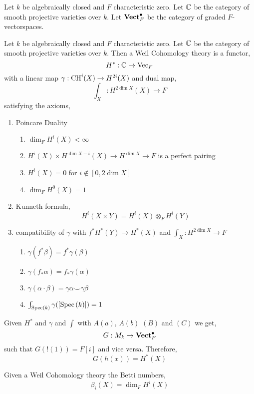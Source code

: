\documentclass[12pt]{article}
\begin{document}
\begin{definition}
Let $k$ be algebraically closed and $F$ characteristic zero. Let $\mathbb{C}$ be the category of smooth projective varieties over $k$. Let $\mathbf{Vect}_F^\bullet$ be the category of graded $F$-vectorspaces. 
\end{definition}

\begin{definition}
Let $k$ be algebraically closed and $F$ characteristic zero. Let $\mathbb{C}$ be the category of smooth projective varieties over $k$. Then a Weil Cohomology theory is a functor,
\[ H^* : \mathbb{C} \to \mathrm{Vec}_F \]
with a linear map $\gamma : \mathrm{CH}^i(X) \to H^{2i}(X)$ and dual map,
\[ \int_X : H^{2 \dim{X}}(X) \to F \] 
satisfying the axioms,
\begin{enumerate}
\item Poincare Duality
\begin{enumerate}
\item $\dim_F H^i(X) < \infty$
\item $H^i(X) \times H^{\dim{X} - i}(X) \to H^{\dim{X}}  \to F$ is a perfect pairing
\item $H^i(X) = 0$ for $i \notin [0, 2 \dim{X}]$
\item $\dim_F H^0(X) = 1$
\end{enumerate}
\item Kunneth formula,
\[ H^i(X \times Y) = H^i(X) \otimes_F H^i(Y) \]
\item compatibility of $\gamma$ with $f^* H^*(Y) \to H^*(X)$ and $\int_X : H^{2 \dim{X}} \to F$
\begin{enumerate}
\item $\gamma (f^* \beta) = f^* \gamma( \beta)$
\item $\gamma (f_* \alpha) = f_* \gamma(\alpha)$
\item $\gamma (\alpha \cdot \beta) = \gamma \alpha \smile \gamma \beta$
\item $\int_{\mathrm{Spec}\left( k \right)} \gamma([\mathrm{Spec}\left( k \right)]) = 1$
\end{enumerate}
\end{enumerate}
\end{definition}

\begin{theorem}
Given $H^*$ and $\gamma$ and $\int$ with $A(a)$, $A(b)$ $(B)$ and $(C)$ we get,
\[ G : M_k \to \mathbf{Vect}_F^\bullet \]
such that $G(!(1)) = F[i]$ and vice versa. Therefore,
\[ G(h(x)) = H^*(X) \]
\end{theorem}

\begin{definition}
Given a Weil Cohomology theory the Betti numbers,
\[ \beta_i(X) = \dim_F H^i(X) \]
\end{definition}
\end{document}
